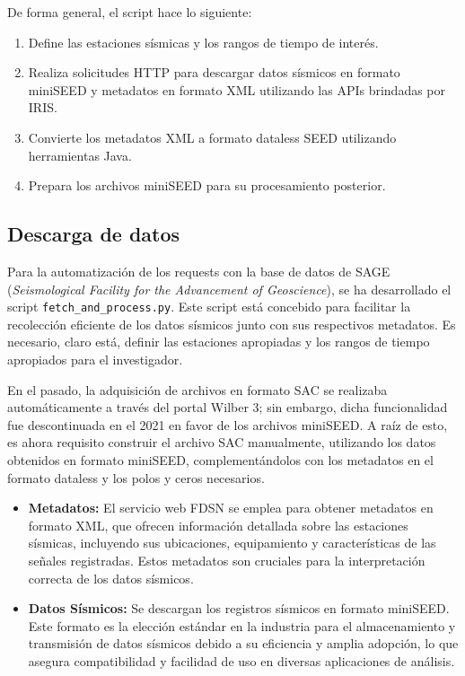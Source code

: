 \documentclass[a4paper,11pt]{refart}
\begin{document}
De forma general, el script hace lo siguiente:

\begin{enumerate}
  \item Define las estaciones sísmicas y los rangos de tiempo de interés.
  \item Realiza solicitudes HTTP para descargar datos sísmicos en formato miniSEED y metadatos en formato XML utilizando las APIs brindadas por IRIS.
  \item Convierte los metadatos XML a formato dataless SEED utilizando herramientas Java.
  \item Prepara los archivos miniSEED para su procesamiento posterior.
\end{enumerate}

\subsection{Descarga de datos}

Para la automatización de los requests con la base de datos de SAGE (\textit{Seismological Facility for the Advancement of Geoscience}), se ha desarrollado el script \texttt{fetch\_and\_process.py}. Este script está concebido para facilitar la recolección eficiente de los datos sísmicos junto con sus respectivos metadatos. Es necesario, claro está, definir las estaciones apropiadas y los rangos de tiempo apropiados para el investigador.

En el pasado, la adquisición de archivos en formato SAC se realizaba automáticamente a través del portal Wilber 3; sin embargo, dicha funcionalidad fue descontinuada en el 2021 en favor de los archivos miniSEED. A raíz de esto, es ahora requisito construir el archivo SAC manualmente, utilizando los datos obtenidos en formato miniSEED, complementándolos con los metadatos en el formato dataless y los polos y ceros necesarios.

\begin{itemize}
    \item \textbf{Metadatos:} El servicio web FDSN se emplea para obtener metadatos en formato XML, que ofrecen información detallada sobre las estaciones sísmicas, incluyendo sus ubicaciones, equipamiento y características de las señales registradas. Estos metadatos son cruciales para la interpretación correcta de los datos sísmicos.
    \item \textbf{Datos Sísmicos:} Se descargan los registros sísmicos en formato miniSEED. Este formato es la elección estándar en la industria para el almacenamiento y transmisión de datos sísmicos debido a su eficiencia y amplia adopción, lo que asegura compatibilidad y facilidad de uso en diversas aplicaciones de análisis.
\end{itemize}
\end{document}
